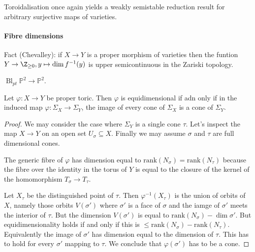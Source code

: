 \documentclass[a4paper]{article}
\renewcommand*{\P}{\mathbb{P}}
\DeclareMathOperator{\Bl}{Bl} %
\begin{document}
\begin{remark}
  Toroidalisation once again yields a weakly semistable reduction result for arbitrary surjective maps of varieties.
\end{remark}

\paragraph{Fibre dimensions}

Fact (Chevalley): if \(X \to Y\) is a proper morphism of varieties then the funtion \(Y \to \Z_{\geq 0}, y \mapsto \dim f^{-1}(y)\) is upper semicontinuous in the Zariski topology.

\begin{eg}
  \(\Bl_{pt} \P^2 \to \P^2\).
\end{eg}

\begin{lemma}
  Let \(\varphi: X \to Y\) be proper toric. Then \(\varphi\) is equidimensional if adn only if in the induced map \(\varphi: \Sigma_X \to \Sigma_Y\), the image of every cone of \(\Sigma_X\) is a cone of \(\Sigma_Y\).
\end{lemma}

\begin{proof}
  We may consider the case where \(\Sigma_Y\) is a single cone \(\tau\). Let's inspect the map \(X \to Y\) on an open set \(U_\sigma \subseteq X\). Finally we may assume \(\sigma\) and \(\tau\) are full dimensional cones.

  The generic fibre of \(\varphi\) has dimension equal to \(\mathrm{rank}(N_\sigma) = \mathrm{rank}(N_\tau)\) because the fibre over the identity in the torus of \(Y\) is equal to the closure of the kernel of the homomorphism \(T_\sigma \to T_\tau\).

  Let \(X_\tau\) be the distinguished point of \(\tau\). Then \(\varphi^{-1}(X_\tau)\) is the union of orbits of \(X\), namely those orbits \(V(\sigma')\) where \(\sigma'\) is a face of \(\sigma\) and the iamge of \(\sigma'\) meets the interior of \(\tau\). But the dimension \(V(\sigma')\) is equal to \(\mathrm{rank}(N_\sigma) - \dim \sigma'\). But equidimensionality holds if and only if this is \(\leq \mathrm{rank}(N_\sigma) - \mathrm{rank}(N_\tau)\). Equivalently the image of \(\sigma'\) has dimension equal to the dimension of \(\tau\). This has to hold for every \(\sigma'\) mapping to \(\tau\). We conclude that \(\varphi(\sigma')\) has to be a cone.
\end{proof}


\printindex
\end{document}
